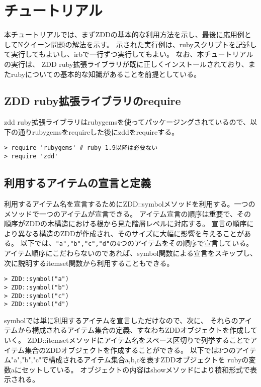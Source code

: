 
\chapter{チュートリアル\label{sect:tutorial}}

本チュートリアルでは、まずZDDの基本的な利用方法を示し、最後に応用例としてNクイーン問題の解法を示す。
示された実行例は、rubyスクリプトを記述して実行してもよいし、irbで一行ずつ実行してもよい。
なお、本チュートリアルの実行は、
ZDD ruby拡張ライブラリが既に正しくインストールされており、またrubyについての基本的な知識があることを前提としている。

\section{ZDD ruby拡張ライブラリのrequire}
zdd ruby拡張ライブラリはrubygemsを使ってパッケージングされているので、以下の通りrubygemsをrequireした後にzddをrequireする。

\begin{Verbatim}[baselinestretch=0.7,frame=single]
> require 'rubygems' # ruby 1.9以降は必要ない
> require 'zdd'
\end{Verbatim}

\section{利用するアイテムの宣言と定義\label{sect:tut_symbol}}
利用するアイテム名を宣言するためにZDD::symbolメソッドを利用する。一つのメソッドで一つのアイテムが宣言できる。
アイテム宣言の順序は重要で、その順序がZDDの木構造における根から見た階層レベルに対応する。
宣言の順序により異なる構造のZDDが作成され、そのサイズに大幅に影響を与えることがある。
以下では、\verb|"a","b","c","d"|の4つのアイテムをその順序で宣言している。
アイテム順序にこだわらないのであれば、symbol関数による宣言をスキップし、次に説明するitemset関数から利用することもできる。

\begin{Verbatim}[baselinestretch=0.7,frame=single]
> ZDD::symbol("a")
> ZDD::symbol("b")
> ZDD::symbol("c")
> ZDD::symbol("d")
\end{Verbatim}

symbolでは単に利用するアイテムを宣言しただけなので、次に、
それらのアイテムから構成されるアイテム集合の定義、すなわちZDDオブジェクトを作成していく。
ZDD::itemsetメソッドにアイテム名をスペース区切りで列挙することでアイテム集合のZDDオブジェクトを作成することができる。
以下では3つのアイテム"a","b","c"で構成されるアイテム集合{a,b,c}を表すZDDオブジェクトを
rubyの変数aにセットしている。
オブジェクトの内容はshowメソッドにより積和形式で表示される。


